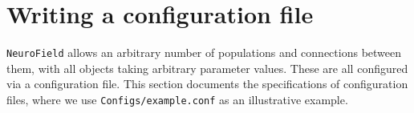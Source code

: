\documentclass[12pt,a4paper]{article}
\newcommand{\type}[1]{ {\small\small\tt #1} }
\newcommand{\NF}[0]{ \type{NeuroField}}
\begin{document}




\section{Writing a configuration file}
\label{sec:config}

\NF allows an arbitrary number of populations and connections between them, with all objects taking arbitrary parameter values. These are all configured via a configuration file. This section documents the specifications of configuration files, where we use \type{Configs/example.conf} as an illustrative example.
\end{document}
